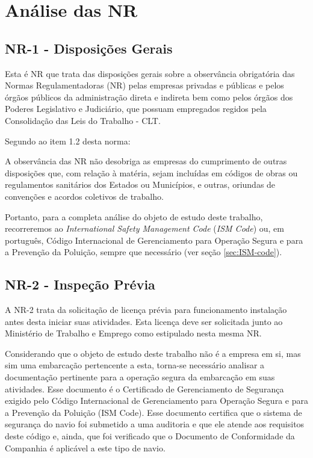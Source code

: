 \documentclass[../main.tex]{subfiles}
\begin{document}
\chapter{Análise das NR}
 \section{NR-1 - Disposições Gerais}
 Esta é NR que trata das disposições gerais sobre a observância obrigatória das Normas Regulamentadoras (NR) pelas empresas privadas e públicas e pelos órgãos públicos da administração direta e indireta bem como pelos órgãos dos Poderes Legislativo e Judiciário, que possuam empregados regidos pela Consolidação das Leis do Trabalho - CLT.

Segundo ao item 1.2 desta norma:

 \begin{citacao}
 A observância das NR não desobriga as empresas do cumprimento de outras disposições que, com relação à matéria, sejam incluídas em códigos de obras ou regulamentos sanitários dos Estados ou Municípios, e outras, oriundas de convenções e acordos coletivos de trabalho.
 \end{citacao}

 Portanto, para a completa análise do objeto de estudo deste trabalho, recorreremos ao \emph{International Safety Management Code} (\emph{ISM Code}) ou, em português, Código Internacional de Gerenciamento para Operação Segura e para a Prevenção da Poluição, sempre que necessário (ver seção \ref{sec:ISM-code}).

 \section{NR-2 - Inspeção Prévia}
 A NR-2 trata da solicitação de licença prévia para funcionamento instalação antes desta iniciar suas atividades. Esta licença deve ser solicitada junto ao Ministério de Trabalho e Emprego como estipulado nesta mesma NR.

 Considerando que o objeto de estudo deste trabalho não é a empresa em si, mas sim uma embarcação pertencente a esta, torna-se necessário analisar a documentação pertinente para a operação segura da embarcação em suas atividades. Esse documento é o Certificado de Gerenciamento de Segurança exigido pelo Código Internacional de Gerenciamento para Operação Segura e para a Prevenção da Poluição (ISM Code). Esse documento certifica que o sistema de segurança do navio foi submetido a uma auditoria e que ele atende aos requisitos deste código e, ainda, que foi verificado que o Documento de Conformidade da Companhia é aplicável a este tipo de navio.
\end{document}
